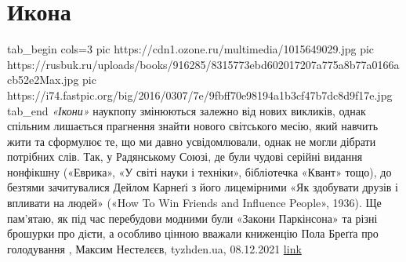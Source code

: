  
 
 
 
 
\chapter{Икона}

\ifcmt
  tab_begin cols=3
		 pic https://cdn1.ozone.ru/multimedia/1015649029.jpg
     pic https://rusbuk.ru/uploads/books/916285/8315773ebd602017207a775a8b77a0166acb52e2Max.jpg
		 pic https://i74.fastpic.org/big/2016/0307/7e/9fbff70e98194a1b3cf47b7dc8d9f17e.jpg
  tab_end
\fi
\emph{«Ікони»} наукпопу змінюються залежно від нових викликів, однак спільним
лишається прагнення знайти нового світського месію, який навчить жити та
сформулює те, що ми давно усвідомлювали, однак не могли дібрати потрібних слів.
Так, у Радянському Союзі, де були чудові серійні видання нонфікшну («Еврика»,
«У світі науки і техніки», бібліотечка «Квант» тощо), до безтями зачитувалися
Дейлом Карнеґі з його лицемірними «Як здобувати друзів і впливати на людей»
(«How To Win Friends and Influence People», 1936). Ще пам’ятаю, як під час
перебудови модними були «Закони Паркінсона» та різні брошурки про дієти, а
особливо цінною вважали книженцію Пола Бреґґа про голодування
, Максим Нестелєєв, tyzhden.ua, 08.12.2021%
\href{https://tyzhden.ua/Columns/50/253787}{link}
